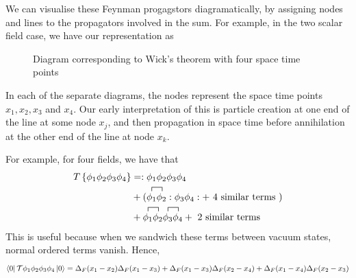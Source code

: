\documentclass[11pt, oneside]{article}   	%
\theoremstyle{newline}
\theoremstyle{newline}
\theoremstyle{newline}
\theoremstyle{newline}
\theoremstyle{newline}
\begin{document}
We can visualise these Feynman progagstors diagramatically, by assigning nodes and lines to the propagators involved in the sum. For example, in the two scalar field case, we have our representation as 

\begin{figure}
\centering  
{}
\caption{Diagram corresponding to Wick's theorem with four space time points} 
\end{figure}  
In each of the separate diagrams, the nodes represent the space time points $x_1, x_2, x_3$ and $x_4$. Our early interpretation of this is particle creation at one end of the line at some node $x_j$, and then propagation in space time before annihilation at the other end of the line at node $x_k$. 

For example, for four fields, we have that 
\begin{align*}
T \left\{ \phi_1 \phi_2 \phi_3 \phi_4  \right\} &=  : \phi_1 \phi_2 \phi_3 \phi_4  \\
						& + ( \contraction{}{\phi_1 } { } { \phi_2} \phi _ 1 \phi_2 : \phi_3 \phi_4: + \text{ 4 similar terms } ) \\
						& + \contraction{}{ \phi_1} {}{\phi_2} \phi_1 \phi_2  \contraction{}{ \phi_3} {}{\phi_3} \phi_3 \phi_4 + \text{ 2 similar terms}
\end{align*} 
This is useful because when we sandwich these terms between vacuum states, normal 
ordered terms vanish. Hence,  
\[ \bra{0}\mathcal{T} \phi_1 \phi_ 2\phi_3 \phi_4 \ket{0} = \Delta_F(x_1 - x_2)\Delta_F(x_1 - x_3) + \Delta_F( x_1 - x_3 ) \Delta_F( x_2 - x_4 ) + \Delta_F( x_1 - x_4 )\Delta_F( x_2 - x_3) \]   
\end{document}
